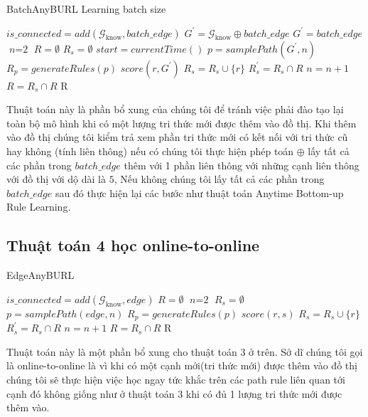 \begin{algorithm}
	\caption{BatchAnyBURL Learning batch size}\label{algorithm3}
	\begin{algorithmic}[1]
		\State $is\_connected = add(\mathcal{G}_{\text{know}}, batch\_edge)$
		\State  $ G^{\prime} = \mathcal{G}_{\text{know}} \oplus batch\_edge$
		\Else
		\State  $ G^{\prime} = batch\_edge$
		\EndIf
		\State $\textit{n} = \text{2}$
		\State $R = \emptyset$
		\Loop
		\State $R_s = \emptyset$
		\State $start = currentTime()$
		\Repeat
		\State $p = samplePath(G^{\prime}, n)$
		\State $R_p = generateRules(p)$
		\State $score(r, G^{\prime})$
		\State $R_s = R_s \cup \{r\}$
		\EndIf
		\EndFor
		\State $R^{\prime}_s = R_s \cap R$
		\State $n = n + 1$
		\EndIf
		\State $R = R_s \cap R$
		\EndLoop
		\Return R
		\EndProcedure
	\end{algorithmic}
\end{algorithm}

Thuật toán này là phần bổ xung của chúng tôi để tránh việc phải đào tạo lại toàn bộ mô hình khi có một lượng tri thức mới được thêm vào đồ thị. Khi thêm vào đồ thị chúng tôi kiểm trả xem phần tri thức mới có kết nối với tri thức cũ hay không (tính liên thông) nếu có chúng tôi thực hiện phép toán \(\oplus\) lấy  tất cả các phần trong \(batch\_edge\) thêm với 1 phần liên thông với những cạnh liên thông với đồ thị với dộ dài là \(5\), Nếu không chúng tôi lấy tất cả các phần trong \(batch\_edge\) sau đó thực hiện lại các bước như thuật toán Anytime Bottom-up Rule Learning.

\subsection{Thuật toán 4 học online-to-online}
\begin{algorithm}
	\caption{EdgeAnyBURL}\label{euclid}
	\begin{algorithmic}[1]
		\State $is\_connected = add(\mathcal{G}_{\text{know}}, edge)$
		\State $R = \emptyset$
		\State $\textit{n} = \text{2}$
		\State $R_s = \emptyset$
		\Repeat
		\State $p = samplePath(edge, n)$
		\State $R_p = generateRules(p)$
		\State $score(r, s)$
		\State $R_s = R_s \cup \{r\}$
		\EndIf
		\EndFor
		\State $R^{\prime}_s = R_s \cap R$
		\State $n = n + 1$
		\EndIf
		\State $R = R_s \cap R$
		\EndIf
		\State \Return R
		\EndProcedure
	\end{algorithmic}
\end{algorithm}

Thuật toán này là một phần bổ xung cho thuật toán 3 ở trên. Sở dĩ chúng tôi gọi là online-to-online là vì khi có một cạnh mới(tri thức mới) được thêm vào đồ thị chúng tôi sẽ thực hiện việc học ngay tức khắc trên các path rule liên quan tới cạnh đó không giống như ở thuật toán 3 khi có đủ 1 lượng tri thức mới được thêm vào.
